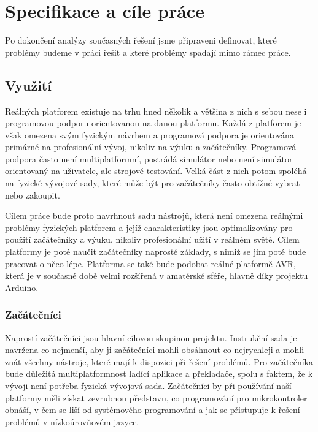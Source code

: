\chapter{Specifikace a cíle práce}

Po dokončení analýzy současných řešení jsme připraveni definovat, které problémy budeme v práci řešit a které problémy spadají mimo rámec práce.

\section{Využití}

Reálných platforem existuje na trhu hned několik a většina z nich s sebou nese i programovou podporu orientovanou na danou platformu. Každá z platforem je však omezena svým fyzickým návrhem a programová podpora je orientována primárně na profesionální vývoj, nikoliv na výuku a začátečníky. Programová podpora často není multiplatformní, postrádá simulátor nebo není simulátor orientovaný na uživatele, ale strojové testování. Velká část z nich potom spoléhá na fyzické vývojové sady, které může být pro začátečníky často obtížné vybrat nebo zakoupit.

Cílem práce bude proto navrhnout sadu nástrojů, která není omezena reálnými problémy fyzických platforem a jejíž charakteristiky jsou optimalizovány pro použití začátečníky a výuku, nikoliv profesionální užití v reálném světě. Cílem platformy je poté naučit začátečníky naprosté základy, s nimiž se jim poté bude pracovat o něco lépe. Platforma se také bude podobat reálné platformě AVR, která je v současné době velmi rozšířená v amatérské sféře, hlavně díky projektu Arduino.

\subsection{Začátečníci}

Naprostí začátečníci jsou hlavní cílovou skupinou projektu. Instrukční sada je navržena co nejmenší, aby ji začátečníci mohli obsáhnout co nejrychleji a mohli znát všechny nástroje, které mají k dispozici při řešení problémů. Pro začátečníka bude důležitá multiplatformnost ladící aplikace a překladače, spolu s faktem, že k vývoji není potřeba fyzická vývojová sada. Začátečníci by při používání naší platformy měli získat zevrubnou představu, co programování pro mikrokontroler obnáší, v čem se liší od systémového programování a jak se přistupuje k řešení problémů v nízkoúrovňovém jazyce.


